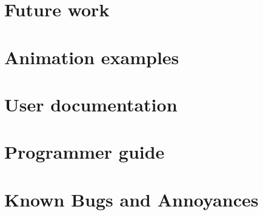 \documentclass{article}
\begin{document}
\section{Future work}







\appendix

\section{Animation examples}
\label{sec:animations}


\section{User documentation}
\label{sec:user_documentation}


\section{Programmer guide}
\label{sec:programmer_guide}


\section{Known Bugs and Annoyances}
\label{sec:bugs}

\end{document}
